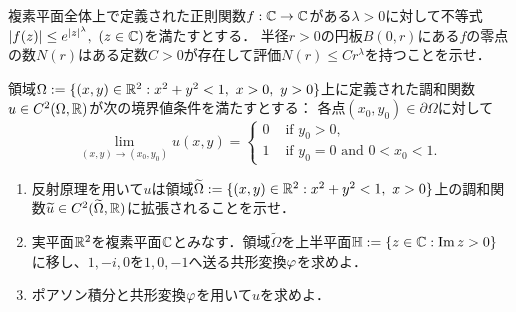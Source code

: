 \documentclass{../../../small}
\renewcommand{\H}{\mathbb{H}}
\begin{document}
\begin{prb}[ネヴァンリンナ個数関数の評価]
複素平面全体上で定義された正則関数$f:\mathbb{C}\to\mathbb{C}$がある$\lambda>0$に対して不等式$|f(z)|\le e^{|z|^\lambda},\ (z\in\C)$を満たすとする．
半径$r>0$の円板$B(0,r)$にある$f$の零点の数$N(r)$はある定数$C>0$が存在して評価$N(r)\le Cr^\lambda$を持つことを示せ．
\end{prb}


\begin{prb}[]
\end{prb}


\begin{prb}[四分円上のディリクレ問題]
領域$\Omega:=\{(x,y)\in\R^2:x^2+y^2<1,\ x>0,\ y>0\}$上に定義された調和関数$u\in C^2(\Omega,\mathbb{R})$が次の境界値条件を満たすとする：
各点$(x_0,y_0)\in\partial\Omega$に対して
\[\lim_{(x,y)\to(x_0,y_0)}u(x,y)=\begin{cases}
0&\text{ if }y_0>0,\\
1&\text{ if }y_0=0\text{ and }0<x_0<1.
\end{cases}\]
\begin{enumerate}[(1)]
\item 反射原理を用いて$u$は領域$\tilde\Omega:=\{(x,y)\in\R^2:x^2+y^2<1,\ x>0\}$上の調和関数$\widetilde u\in C^2(\widetilde\Omega,\mathbb{R})$に拡張されることを示せ．
\item 実平面$\mathbb{R}^2$を複素平面$\mathbb{C}$とみなす．領域$\tilde\Omega$を上半平面$\H:=\{z\in\C:\Im z>0\}$に移し、$1,-i,0$を$1,0,-1$へ送る共形変換$\varphi$を求めよ．
\item ポアソン積分と共形変換$\varphi$を用いて$u$を求めよ．
\end{enumerate}
\end{prb}


\newpage
\end{document}
